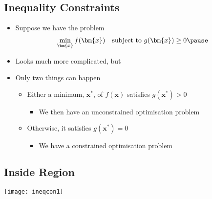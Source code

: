 \begin{slide}
\section{Inequality Constraints}

\begin{PauseHighLight}
  \begin{itemize}
  \item Suppose we have the problem
    \begin{align*}
      \min_{\bm{x}} f(\bm{x}) \quad \mbox{subject to $g(\bm{x})\geq 0$}\pause
    \end{align*}
  \item Looks much more complicated, but\pause
  \item Only two things can happen
    \begin{itemize}
    \item Either a minimum, $\bm{x}^*$, of $f(\bm{x})$ satisfies
    $g(\bm{x}^*)>0$ 
      \begin{itemize}
      \item We then have an unconstrained optimisation problem\pause
      \end{itemize}
    \item Otherwise, it satisfies  $g(\bm{x}^*)=0$
      \begin{itemize}
      \item We have a constrained optimisation problem\pause
      \end{itemize}
    \end{itemize}
  \end{itemize}
\end{PauseHighLight}

\end{slide}



\begin{slide}
\section[-2]{Inside Region}

\begin{center}
  \texttt{[image: ineqcon1]}
\end{center}
\end{slide}


